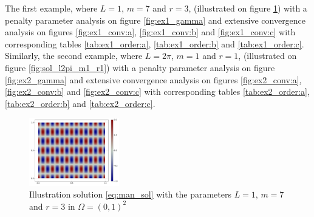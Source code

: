 The first example, where $L=1$, $m=7$ and $r=3$, (illustrated on figure \ref{fig:sol_l1_m7_r3}) with a penalty parameter analysis on figure \ref{fig:ex1_gamma} and extensive convergence analysis on figures \ref{fig:ex1_conv:a}, \ref{fig:ex1_conv:b} and \ref{fig:ex1_conv:c} with
corresponding tables \ref{tab:ex1_order:a}, \ref{tab:ex1_order:b} and \ref{tab:ex1_order:c}. Similarly, the second example, where $L=2\pi$, $m=1$ and $r=1$, (illustrated on figure \ref{fig:sol_l2pi_m1_r1}) with a penalty parameter analysis on figure \ref{fig:ex2_gamma} and extensive convergence analysis on figures \ref{fig:ex2_conv:a},
\ref{fig:ex2_conv:b} and \ref{fig:ex2_conv:c} with corresponding tables \ref{tab:ex2_order:a}, \ref{tab:ex2_order:b} and \ref{tab:ex2_order:c}.

\begin{figure}[tbh!]
    \centering
    \includegraphics[width=0.35\textwidth]{figures/model/l_1.0_m_7_r_3n_100_sol.png}
    \caption{Illustration  solution \eqref{eq:man_sol}   with the parameters $L=1$, $m=7$ and $r=3$ in $\Omega = (0,1)^2$}
    \label{fig:sol_l1_m7_r3}
\end{figure}

